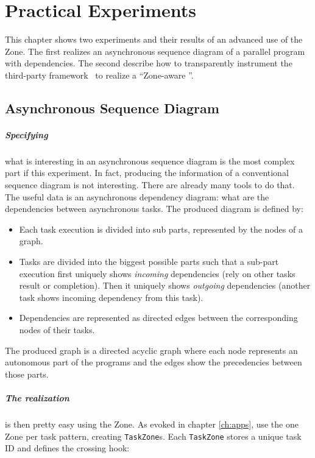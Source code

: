 
\chapter{Practical Experiments}
\label{ch:inpractice}

This chapter shows two experiments and their results of an advanced use of the Zone. The first realizes an asynchronous sequence diagram of a parallel program with dependencies. The second describe how to transparently instrument the third-party framework \vertx\ to realize a ``Zone-aware \vertx''.

\section{Asynchronous Sequence Diagram}


\paragraph{Specifying} what is interesting in an asynchronous sequence diagram is the most complex part if this experiment. In fact, producing the information of a conventional sequence diagram is not interesting. There are already many tools to do that. The useful data is an asynchronous dependency diagram: what are the dependencies between asynchronous tasks. The produced diagram is defined by:

\begin{itemize}
\item Each task execution is divided into sub parts, represented by the nodes of a graph.
\item Tasks are divided into the biggest possible parts such that a sub-part execution first uniquely shows \emph{incoming} dependencies (rely on other tasks result or completion). Then it uniquely shows \emph{outgoing} dependencies (another task shows incoming dependency from this task).
\item Dependencies are represented as directed edges between the corresponding nodes of their tasks.
\end{itemize}

The produced graph is a directed acyclic graph where each node represents an autonomous part of the programs and the edges show the precedencies between those parts.

\paragraph{The realization} is then pretty easy using the Zone. As evoked in chapter \ref{ch:apps}, use the one Zone per task pattern, creating \lstinline{TaskZone}s. Each \lstinline{TaskZone} stores a unique task ID and defines the crossing hook: 

